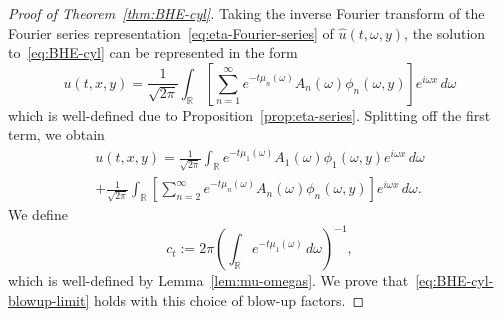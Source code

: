 \documentclass[a4paper, reqno,titlepage]{amsart}
\numberwithin{equation}{section}
\theoremstyle{plain}
\theoremstyle{definition}
\theoremstyle{remark}
\newcommand{\RR}{\mathbb{R}}
\begin{document}
\begin{proof}[Proof of Theorem~\ref{thm:BHE-cyl}]
  Taking the inverse Fourier transform of the Fourier series representation~\eqref{eq:eta-Fourier-series} of $\widehat{u}(t,\omega,y)$, the solution to~\eqref{eq:BHE-cyl} can be represented in the form
  \begin{equation*}
    u(t,x,y)
    = \frac{1}{\sqrt{2\pi}}\int_{\RR} \left[ \sum_{n=1}^\infty e^{-t \mu_n(\omega)} A_n(\omega) \phi_n(\omega, y) \right] e^{i \omega x} \,d\omega
  \end{equation*}
  which is well-defined due to Proposition~\ref{prop:eta-series}. Splitting off the first term, we obtain
  \begin{multline}
    \label{eq:u-split1}
    u(t,x,y)
    = \frac{1}{\sqrt{2\pi}}\int_{\RR} e^{-t \mu_1(\omega)} A_1(\omega) \phi_1(\omega, y) e^{i\omega x} \,d\omega \\
    + \frac{1}{\sqrt{2\pi}}\int_{\RR} \left[ \sum_{n=2}^\infty e^{-t \mu_n(\omega)} A_n(\omega) \phi_n(\omega, y) \right] e^{i \omega x} \,d\omega.
  \end{multline}
  We define
  \begin{equation}
    \label{eq:ct-cyl}
    c_t:=2\pi\left(\int_{\RR}e^{-t\mu_1(\omega)}\,d\omega\right)^{-1},
  \end{equation}
  which is well-defined by Lemma~\ref{lem:mu-omegas}. We prove that~\eqref{eq:BHE-cyl-blowup-limit} holds with this choice of blow-up factors.


\end{proof}
\end{document}
